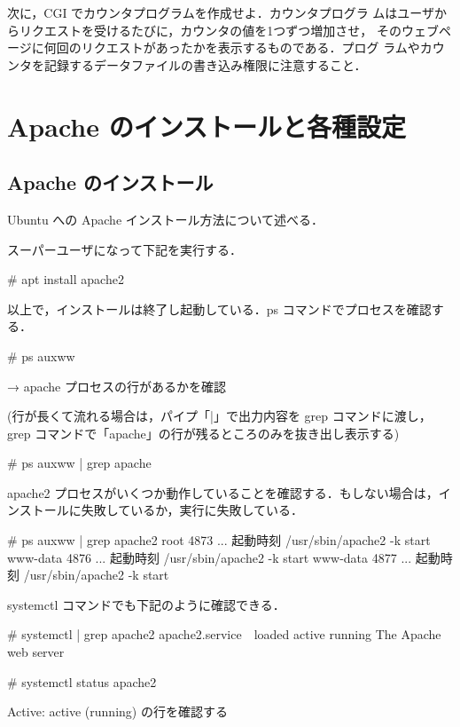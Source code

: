 次に，CGI でカウンタプログラムを作成せよ．カウンタプログラ
ムはユーザからリクエストを受けるたびに，カウンタの値を1つずつ増加させ，
そのウェブページに何回のリクエストがあったかを表示するものである．プログ
ラムやカウンタを記録するデータファイルの書き込み権限に注意すること．

\section{Apache のインストールと各種設定}

\subsection{Apache のインストール}

Ubuntu への Apache インストール方法について述べる．

スーパーユーザになって下記を実行する．
\begin{cli}
# apt install apache2
\end{cli}

以上で，インストールは終了し起動している．ps コマンドでプロセスを確認する．
\begin{cli}
# ps auxww

 → apache プロセスの行があるかを確認

(行が長くて流れる場合は，パイプ「|」で出力内容を grep コマンドに渡し，
grep コマンドで「apache」の行が残るところのみを抜き出し表示する)

# ps auxww | grep apache

\end{cli}

apache2 プロセスがいくつか動作していることを確認する．もしない場合は，インストールに失敗しているか，実行に失敗している．

\begin{cli}
# ps auxww | grep apache2
root      4873  ...  起動時刻 /usr/sbin/apache2 -k start
www-data  4876  ...  起動時刻 /usr/sbin/apache2 -k start
www-data  4877  ...  起動時刻 /usr/sbin/apache2 -k start
\end{cli}

systemctl コマンドでも下記のように確認できる．

\begin{cli}
# systemctl | grep apache2
apache2.service　loaded active running  The Apache web server

# systemctl status apache2

Active: active (running) の行を確認する
\end{cli}

